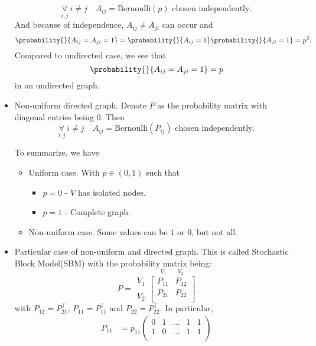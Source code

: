 \begin{itemize}
	      \[
		      \underset{i, j}{\forall}\ i\neq j\quad A_{ij}= \mathrm{Bernoulli}(p) \text{ chosen independently}.
	      \]
	      And because of independence, \(A_{ij}\neq A_{ji}\) can occur and
	      \[
		      \probability{}{A_{ij} = A_{ji} = 1} = \probability{}{A_{ij} = 1} \probability{}{ A_{ji} = 1} = p^2.
	      \]
	      Compared to undirected case, we see that
	      \[
		      \probability{}{A_{ij} = A_{ji} = 1} = p
	      \]
	      in an undirected graph.
	\item Non-uniform directed graph. Denote \(P\) as the probability matrix with diagonal entries being \(0\). Then
	      \[
		      \underset{i, j}{\forall}\ i\neq j\quad A_{ij} = \mathrm{Bernoulli}(P_{ij})\text{ chosen independently}.
	      \]
	      \begin{remark}
		      To summarize, we have
		      \begin{itemize}
			      \item Uniform case. With \(p\in(0, 1)\) such that
			            \begin{itemize}
				            \item \(p = 0\) - \(V\) has isolated nodes.
				            \item \(p = 1\) - Complete graph.
			            \end{itemize}
			      \item Non-uniform case. Some values can be \(1\) or \(0\), but not all.
		      \end{itemize}
	      \end{remark}
	\item Particular case of non-uniform and directed graph. This is called Stochastic Block Model(SBM) with the probability matrix being:
	      \[
		      P = \substack{V_1 \\ \\ V_2}\overset{V_1\qquad V_2}{\begin{bmatrix}
				      P_{11} & P_{12} \\
				      P_{21} & P_{22} \\
			      \end{bmatrix}}
	      \]
	      with \(P_{12} = P_{21}^{\top}\), \(P_{11} = P_{11}^{\top}\) and \(P_{22} = P_{22}^{\top}\). In particular,
	      \[
		      \begin{alignedat}{3}
			      P_{11} &= p_{11}\begin{pmatrix}
				      0      & 1      & \ldots & 1      & 1      \\
				      1      & 0      & \ldots & 1      & 1      \\

\end{pmatrix}
\end{alignedat}\]
\end{itemize}
